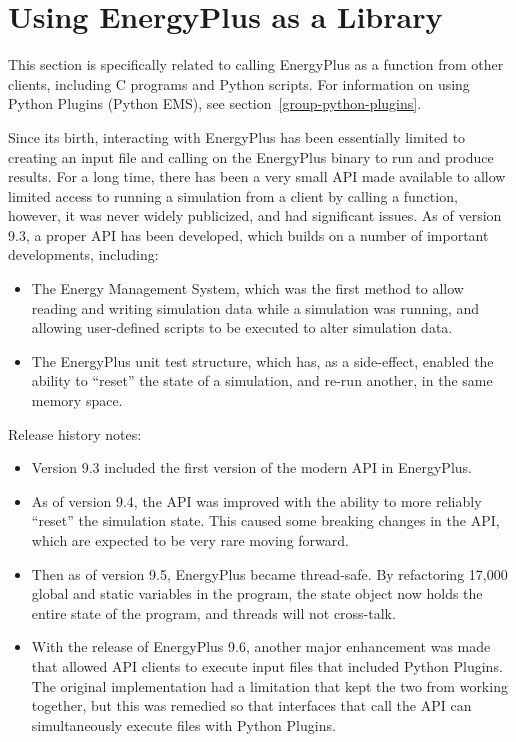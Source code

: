
\section{Using EnergyPlus as a Library}\label{api-usage}

This section is specifically related to calling EnergyPlus as a function from other clients, including C programs and Python scripts.
For information on using Python Plugins (Python EMS), see section~\ref{group-python-plugins}.

Since its birth, interacting with EnergyPlus has been essentially limited to creating an input file and calling on the EnergyPlus binary to run and produce results.
For a long time, there has been a very small API made available to allow limited access to running a simulation from a client by calling a function, however, it was never widely publicized, and had significant issues.
As of version 9.3, a proper API has been developed, which builds on a number of important developments, including:

\begin{itemize}
 \item The Energy Management System, which was the first method to allow reading and writing simulation data while a simulation was running, and allowing user-defined scripts to be executed to alter simulation data.
 \item The EnergyPlus unit test structure, which has, as a side-effect, enabled the ability to ``reset'' the state of a simulation, and re-run another, in the same memory space.
\end{itemize}

Release history notes:

\begin{itemize}
    \item Version 9.3 included the first version of the modern API in EnergyPlus.
    \item As of version 9.4, the API was improved with the ability to more reliably ``reset'' the simulation state.  This caused some breaking changes in the API, which are expected to be very rare moving forward.
    \item Then as of version 9.5, EnergyPlus became thread-safe.  By refactoring 17,000 global and static variables in the program, the state object now holds the entire state of the program, and threads will not cross-talk.
    \item With the release of EnergyPlus 9.6, another major enhancement was made that allowed API clients to execute input files that included Python Plugins. The original implementation had a limitation that kept the two from working together, but this was remedied so that interfaces that call the API can simultaneously execute files with Python Plugins.
\end{itemize}

